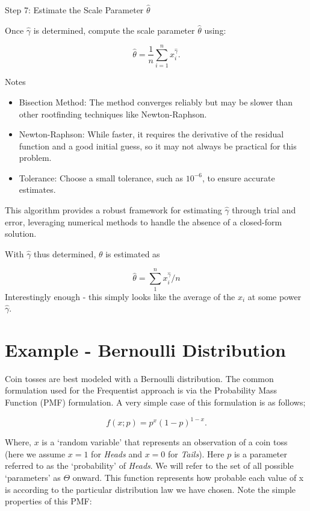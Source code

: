 \documentclass[
  12 pt,
  a4paper,
]{book}
\providecommand{\tightlist}{%
  \setlength{\itemsep}{0pt}\setlength{\parskip}{0pt}}
\numberwithin{equation}{section}
\theoremstyle{plain}      %
\theoremstyle{definition} %
\theoremstyle{remark}     %
\theoremstyle{note}         %
\begin{document}
Step 7: Estimate the Scale Parameter \(\hat{\theta}\)

Once \(\hat{\gamma}\) is determined, compute the scale parameter
\(\hat{\theta}\) using:

\[
\hat{\theta}=\frac{1}{n} \sum_{i=1}^n x_i^{\hat{\gamma}} .
\]

Notes

\begin{itemize}
\tightlist
\item
  Bisection Method: The method converges reliably but may be slower than
  other rootfinding techniques like Newton-Raphson.
\item
  Newton-Raphson: While faster, it requires the derivative of the
  residual function and a good initial guess, so it may not always be
  practical for this problem.
\item
  Tolerance: Choose a small tolerance, such as \(10^{-6}\), to ensure
  accurate estimates.
\end{itemize}

This algorithm provides a robust framework for estimating
\(\hat{\gamma}\) through trial and error, leveraging numerical methods
to handle the absence of a closed-form solution.

With \(\hat{\gamma}\) thus determined, \(\theta\) is estimated as

\[
\hat{\theta}=\sum_{1}^{n} x_{i}^{\hat{\gamma}} / n
\] \noindent Interestingly enough - this simply looks like the average
of the \(x_{i}\) at some power \(\hat{\gamma}\).

\newpage

\hypertarget{example---bernoulli-distribution}{%
\section{Example - Bernoulli
Distribution}\label{example---bernoulli-distribution}}

Coin tosses are best modeled with a Bernoulli distribution. The common
formulation used for the Frequentist approach is via the Probability
Mass Function (PMF) formulation. A very simple case of this formulation
is as follows;

\[
f(x ; p)=p^{x}(1-p)^{1-x}.
\]

Where, \(x\) is a `random variable' that represents an observation of a
coin toss (here we assume \(x=1\) for \textit{Heads} and \(x=0\) for
\textit{Tails}). Here \(p\) is a parameter referred to as the
`probability' of \textit{Heads}. We will refer to the set of all
possible `parameters' as \(\Theta\) onward. This function represents how
probable each value of x is according to the particular distribution law
we have chosen. Note the simple properties of this PMF:
\end{document}
